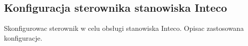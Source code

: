 \subsection{Konfiguracja sterownika stanowiska Inteco}
\label{lab:zad7}


%    

Skonfigurowac sterownik w celu obsługi stanowiska Inteco. Opisac zastosowana konfiguracje.

\newpage
